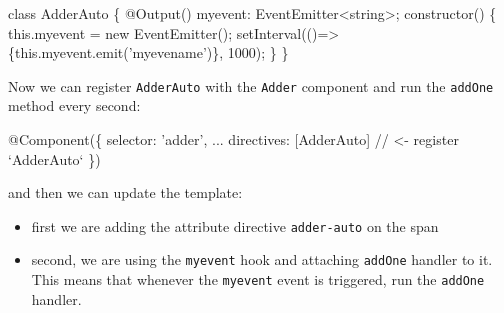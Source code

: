\documentclass[12pt,]{article}
\newenvironment{Shaded}{}{}
\newcommand{\KeywordTok}[1]{\textcolor[rgb]{0.00,0.00,1.00}{{#1}}}
\newcommand{\DecValTok}[1]{{#1}}
\newcommand{\StringTok}[1]{\textcolor[rgb]{0.00,0.50,0.50}{{#1}}}
\newcommand{\CommentTok}[1]{\textcolor[rgb]{0.00,0.50,0.00}{{#1}}}
\newcommand{\OtherTok}[1]{\textcolor[rgb]{1.00,0.25,0.00}{{#1}}}
\newcommand{\FunctionTok}[1]{{#1}}
\newcommand{\ErrorTok}[1]{\textcolor[rgb]{1.00,0.00,0.00}{\textbf{{#1}}}}
\newcommand{\NormalTok}[1]{{#1}}
\providecommand{\tightlist}{%
  \setlength{\itemsep}{0pt}\setlength{\parskip}{0pt}}
\begin{document}
\begin{Shaded}
\begin{Highlighting}[numbers=left,,]
\KeywordTok{class} \NormalTok{AdderAuto \{}
  \FunctionTok{@Output}\NormalTok{() myevent: EventEmitter<string>;}
  \FunctionTok{constructor}\NormalTok{() \{}
    \KeywordTok{this}\NormalTok{.}\FunctionTok{myevent} \NormalTok{= }\KeywordTok{new} \FunctionTok{EventEmitter}\NormalTok{();}
    \FunctionTok{setInterval}\NormalTok{(()=> \{}\KeywordTok{this}\NormalTok{.}\FunctionTok{myevent}\NormalTok{.}\FunctionTok{emit}\NormalTok{('myevename')\}, }\DecValTok{1000}\NormalTok{);}
  \NormalTok{\}}
\NormalTok{\}}
\end{Highlighting}
\end{Shaded}

Now we can register \texttt{AdderAuto} with the \texttt{Adder} component
and run the \texttt{addOne} method every second:

\begin{Shaded}
\begin{Highlighting}[numbers=left,,]
\FunctionTok{@Component}\NormalTok{(\{}
  \NormalTok{selector: 'adder',}
  \NormalTok{...}
  \NormalTok{directives: [AdderAuto] }\CommentTok{// <- register `AdderAuto`}
\NormalTok{\})}
\end{Highlighting}
\end{Shaded}

and then we can update the template:

\begin{Shaded}
\end{Shaded}

\begin{itemize}
\tightlist
\item
  first we are adding the attribute directive \texttt{adder-auto} on the
  span
\item
  second, we are using the \texttt{myevent} hook and attaching
  \texttt{addOne} handler to it. This means that whenever the
  \texttt{myevent} event is triggered, run the \texttt{addOne} handler.
\end{itemize}
\end{document}
